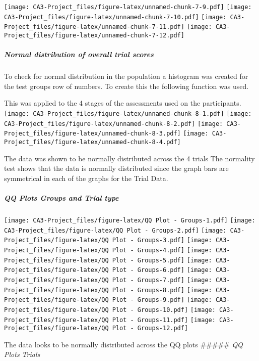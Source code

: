 \documentclass[
]{article}
\begin{document}
\texttt{[image: CA3-Project\_files/figure-latex/unnamed-chunk-7-9.pdf]}
\texttt{[image: CA3-Project\_files/figure-latex/unnamed-chunk-7-10.pdf]}
\texttt{[image: CA3-Project\_files/figure-latex/unnamed-chunk-7-11.pdf]}
\texttt{[image: CA3-Project\_files/figure-latex/unnamed-chunk-7-12.pdf]}

\hypertarget{normal-distribution-of-overall-trial-scores}{%
\subparagraph{\texorpdfstring{\emph{Normal distribution of overall trial
scores}}{Normal distribution of overall trial scores}}\label{normal-distribution-of-overall-trial-scores}}

To check for normal distribution in the population a histogram was
created for the test groups row of numbers. To create this the following
function was used.

This was applied to the 4 stages of the assessments used on the
participants.
\texttt{[image: CA3-Project\_files/figure-latex/unnamed-chunk-8-1.pdf]}
\texttt{[image: CA3-Project\_files/figure-latex/unnamed-chunk-8-2.pdf]}
\texttt{[image: CA3-Project\_files/figure-latex/unnamed-chunk-8-3.pdf]}
\texttt{[image: CA3-Project\_files/figure-latex/unnamed-chunk-8-4.pdf]}

The data was shown to be normally distributed across the 4 trials The
normality test shows that the data is normally distributed since the
graph bars are symmetrical in each of the graphs for the Trial Data.

\hypertarget{qq-plots-groups-and-trial-type}{%
\subparagraph{\texorpdfstring{\emph{QQ Plots Groups and Trial
type}}{QQ Plots Groups and Trial type}}\label{qq-plots-groups-and-trial-type}}

\texttt{[image: CA3-Project\_files/figure-latex/QQ Plot - Groups-1.pdf]}
\texttt{[image: CA3-Project\_files/figure-latex/QQ Plot - Groups-2.pdf]}
\texttt{[image: CA3-Project\_files/figure-latex/QQ Plot - Groups-3.pdf]}
\texttt{[image: CA3-Project\_files/figure-latex/QQ Plot - Groups-4.pdf]}
\texttt{[image: CA3-Project\_files/figure-latex/QQ Plot - Groups-5.pdf]}
\texttt{[image: CA3-Project\_files/figure-latex/QQ Plot - Groups-6.pdf]}
\texttt{[image: CA3-Project\_files/figure-latex/QQ Plot - Groups-7.pdf]}
\texttt{[image: CA3-Project\_files/figure-latex/QQ Plot - Groups-8.pdf]}
\texttt{[image: CA3-Project\_files/figure-latex/QQ Plot - Groups-9.pdf]}
\texttt{[image: CA3-Project\_files/figure-latex/QQ Plot - Groups-10.pdf]}
\texttt{[image: CA3-Project\_files/figure-latex/QQ Plot - Groups-11.pdf]}
\texttt{[image: CA3-Project\_files/figure-latex/QQ Plot - Groups-12.pdf]}

The data looks to be normally distributed across the QQ plots \#\#\#\#\#
\emph{QQ Plots Trials}
\end{document}
